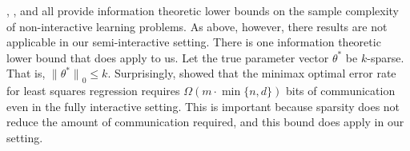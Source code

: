 \documentclass[twoside]{article}
\newcommand{\w}{\theta}
\newcommand{\wstar}{{\w^{*}}}
\newcommand{\lzero}[1]{{\lVert {#1} \rVert}_0}
\begin{document}
\cite{shamir2014fundamental}, \cite{zhang2013information}, and \cite{garg2014communication} all provide information theoretic lower bounds on the sample complexity of non-interactive learning problems.
As above, however, there results are not applicable in our semi-interactive setting.
There is one information theoretic lower bound that does apply to us.
Let the true parameter vector $\wstar$ be $k$-sparse.
That is, $\lzero{\wstar} \le k$.
Surprisingly, \cite{braverman2015communication} showed that the minimax optimal error rate for least squares regression requires $\Omega(m\cdot\min\{n,d\})$ bits of communication even in the fully interactive setting.
This is important because sparsity does not reduce the amount of communication required, and this bound does apply in our setting.
\end{document}
